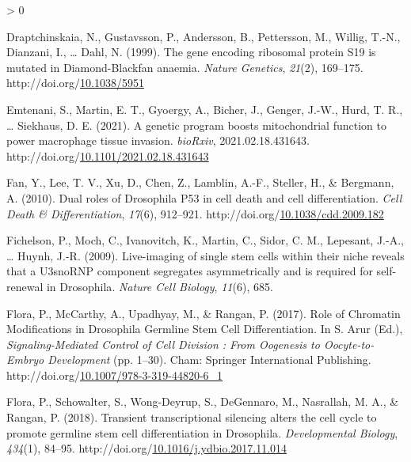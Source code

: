 \documentclass[12pt,oneside]{reedthesis}
\newlength{\cslhangindent}
\newenvironment{CSLReferences}[2] %
 {%
  \setlength{\parindent}{0pt}
  \ifodd #1 \everypar{\setlength{\hangindent}{\cslhangindent}}\ignorespaces\fi
  \ifnum #2 > 0
  \setlength{\parskip}{#2\baselineskip}
  \fi
 }%
 {}
\begin{document}
\begin{CSLReferences}{1}{0}
\leavevmode\hypertarget{ref-draptchinskaiaGeneEncodingRibosomal1999}{}%
Draptchinskaia, N., Gustavsson, P., Andersson, B., Pettersson, M., Willig, T.-N., Dianzani, I., \ldots{} Dahl, N. (1999). The gene encoding ribosomal protein {S19} is mutated in {Diamond-Blackfan} anaemia. \emph{Nature Genetics}, \emph{21}(2), 169--175. http://doi.org/\href{https://doi.org/10.1038/5951}{10.1038/5951}

\leavevmode\hypertarget{ref-emtenaniGeneticProgramBoosts2021}{}%
Emtenani, S., Martin, E. T., Gyoergy, A., Bicher, J., Genger, J.-W., Hurd, T. R., \ldots{} Siekhaus, D. E. (2021). A genetic program boosts mitochondrial function to power macrophage tissue invasion. \emph{bioRxiv}, 2021.02.18.431643. http://doi.org/\href{https://doi.org/10.1101/2021.02.18.431643}{10.1101/2021.02.18.431643}

\leavevmode\hypertarget{ref-fanDualRolesDrosophila2010}{}%
Fan, Y., Lee, T. V., Xu, D., Chen, Z., Lamblin, A.-F., Steller, H., \& Bergmann, A. (2010). Dual roles of {Drosophila} P53 in cell death and cell differentiation. \emph{Cell Death \& Differentiation}, \emph{17}(6), 912--921. http://doi.org/\href{https://doi.org/10.1038/cdd.2009.182}{10.1038/cdd.2009.182}

\leavevmode\hypertarget{ref-Fichelson2009a}{}%
Fichelson, P., Moch, C., Ivanovitch, K., Martin, C., Sidor, C. M., Lepesant, J.-A., \ldots{} Huynh, J.-R. (2009). Live-imaging of single stem cells within their niche reveals that a {U3snoRNP} component segregates asymmetrically and is required for self-renewal in {Drosophila}. \emph{Nature Cell Biology}, \emph{11}(6), 685.

\leavevmode\hypertarget{ref-floraRoleChromatinModifications2017}{}%
Flora, P., McCarthy, A., Upadhyay, M., \& Rangan, P. (2017). Role of {Chromatin Modifications} in {Drosophila Germline Stem Cell Differentiation}. In S. Arur (Ed.), \emph{Signaling-{Mediated Control} of {Cell Division} : {From Oogenesis} to {Oocyte-to-Embryo Development}} (pp. 1--30). {Cham}: {Springer International Publishing}. http://doi.org/\href{https://doi.org/10.1007/978-3-319-44820-6_1}{10.1007/978-3-319-44820-6\_1}

\leavevmode\hypertarget{ref-Flora2018l}{}%
Flora, P., Schowalter, S., Wong-Deyrup, S., DeGennaro, M., Nasrallah, M. A., \& Rangan, P. (2018). Transient transcriptional silencing alters the cell cycle to promote germline stem cell differentiation in {Drosophila}. \emph{Developmental Biology}, \emph{434}(1), 84--95. http://doi.org/\href{https://doi.org/10.1016/j.ydbio.2017.11.014}{10.1016/j.ydbio.2017.11.014}


\end{CSLReferences}
\end{document}
